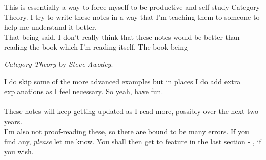 This is essentially a way to force myself to be productive and self-study Category Theory. I try to write these notes in a way that I'm teaching them to someone to help me understand it better.\\
That being said, I don't really think that these notes would be better than reading the book which I'm reading itself. The book being - 
\begin{center}
	\emph{Category Theory} by \emph{Steve Awodey}.
\end{center}
I do skip some of the more advanced examples but in places I do add extra explanations as I feel necessary. So yeah, have fun.\\~\\
These notes will keep getting updated as I read more, possibly over the next two years.\\
I'm also not proof-reading these, so there are bound to be many errors. If you find any, \emph{please} let me know. You shall then get to feature in the last section - , if you wish.